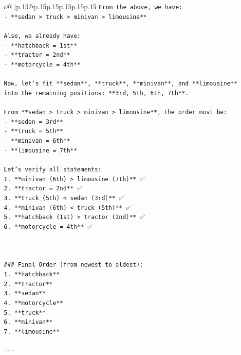\documentclass{article}
\begin{document}
{\begin{supertabular}{c@{$\;$}|p{.15\linewidth}@{}p{.15\linewidth}p{.15\linewidth}p{.15\linewidth}p{.15\linewidth}p{.15\linewidth}}
{{{\texttt{From the above, we have:} \\
\texttt{{-} **sedan > truck > minivan > limousine**} \\
\\ 
\texttt{Also, we already have:} \\
\texttt{{-} **hatchback = 1st**} \\
\texttt{{-} **tractor = 2nd**} \\
\texttt{{-} **motorcycle = 4th**} \\
\\ 
\texttt{Now, let's fit **sedan**, **truck**, **minivan**, and **limousine** into the remaining positions: **3rd, 5th, 6th, 7th**.} \\
\\ 
\texttt{From **sedan > truck > minivan > limousine**, the order must be:} \\
\texttt{{-} **sedan = 3rd**} \\
\texttt{{-} **truck = 5th**} \\
\texttt{{-} **minivan = 6th**} \\
\texttt{{-} **limousine = 7th**} \\
\\ 
\texttt{Let's verify all statements:} \\
\texttt{1. **minivan (6th) > limousine (7th)** ✅} \\
\texttt{2. **tractor = 2nd** ✅} \\
\texttt{3. **truck (5th) < sedan (3rd)** ✅} \\
\texttt{4. **minivan (6th) < truck (5th)** ✅} \\
\texttt{5. **hatchback (1st) > tractor (2nd)** ✅} \\
\texttt{6. **motorcycle = 4th** ✅} \\
\\ 
\texttt{{-}{-}{-}} \\
\\ 
\texttt{\#\#\# Final Order (from newest to oldest):} \\
\texttt{1. **hatchback**} \\
\texttt{2. **tractor**} \\
\texttt{3. **sedan**} \\
\texttt{4. **motorcycle**} \\
\texttt{5. **truck**} \\
\texttt{6. **minivan**} \\
\texttt{7. **limousine**} \\
\\ 
\texttt{{-}{-}{-}} \\
}}}
\end{supertabular}}
\end{document}
